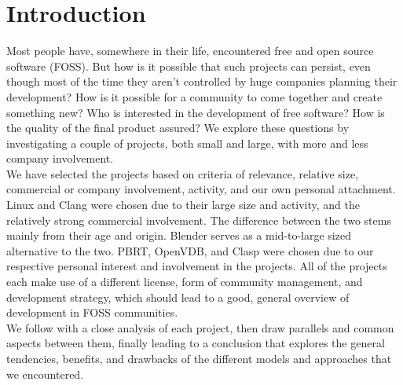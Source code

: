\section{Introduction}
Most people have, somewhere in their life, encountered free and open source software (FOSS). But how is it possible that such projects can persist, even though most of the time they aren't controlled by huge companies planning their development? How is it possible for a community to come together and create something new? Who is interested in the development of free software? How is the quality of the final product assured? We explore these questions by investigating a couple of projects, both small and large, with more and less company involvement. \\

We have selected the projects based on criteria of relevance, relative size, commercial or company involvement, activity, and our own personal attachment. Linux and Clang were chosen due to their large size and activity, and the relatively strong commercial involvement. The difference between the two stems mainly from their age and origin. Blender serves as a mid-to-large sized alternative to the two. PBRT, OpenVDB, and Clasp were chosen due to our respective personal interest and involvement in the projects. All of the projects each make use of a different license, form of community management, and development strategy, which should lead to a good, general overview of development in FOSS communities. \\

We follow with a close analysis of each project, then draw parallels and common aspects between them, finally leading to a conclusion that explores the general tendencies, benefits, and drawbacks of the different models and approaches that we encountered.

